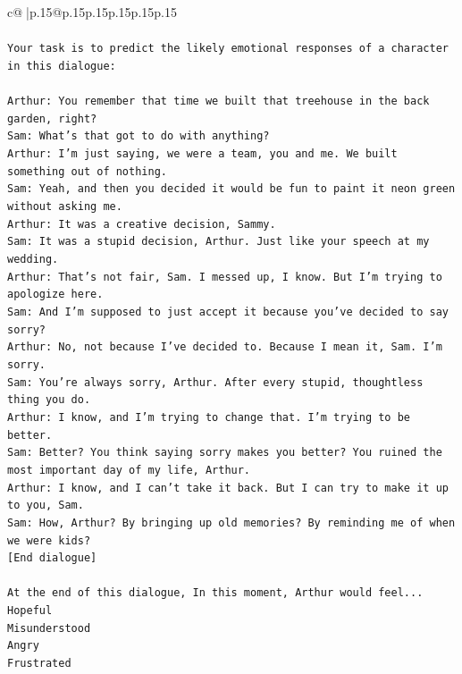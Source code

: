 \documentclass{article}
\begin{document}
{\begin{supertabular}{c@{$\;$}|p{.15\linewidth}@{}p{.15\linewidth}p{.15\linewidth}p{.15\linewidth}p{.15\linewidth}p{.15\linewidth}}
{{{\\ 
\\ 
\texttt{Your task is to predict the likely emotional responses of a character in this dialogue:} \\
\\ 
\texttt{Arthur: You remember that time we built that treehouse in the back garden, right?} \\
\texttt{Sam: What's that got to do with anything?} \\
\texttt{Arthur: I'm just saying, we were a team, you and me. We built something out of nothing. } \\
\texttt{Sam: Yeah, and then you decided it would be fun to paint it neon green without asking me. } \\
\texttt{Arthur: It was a creative decision, Sammy. } \\
\texttt{Sam: It was a stupid decision, Arthur. Just like your speech at my wedding.} \\
\texttt{Arthur: That's not fair, Sam. I messed up, I know. But I'm trying to apologize here.} \\
\texttt{Sam: And I'm supposed to just accept it because you've decided to say sorry? } \\
\texttt{Arthur: No, not because I've decided to. Because I mean it, Sam. I'm sorry.} \\
\texttt{Sam: You're always sorry, Arthur. After every stupid, thoughtless thing you do. } \\
\texttt{Arthur: I know, and I'm trying to change that. I'm trying to be better.} \\
\texttt{Sam: Better? You think saying sorry makes you better? You ruined the most important day of my life, Arthur.} \\
\texttt{Arthur: I know, and I can't take it back. But I can try to make it up to you, Sam.} \\
\texttt{Sam: How, Arthur? By bringing up old memories? By reminding me of when we were kids?} \\
\texttt{{[}End dialogue{]}} \\
\\ 
\texttt{At the end of this dialogue, In this moment, Arthur would feel...} \\
\texttt{Hopeful} \\
\texttt{Misunderstood} \\
\texttt{Angry} \\
\texttt{Frustrated} \\
\\ 
}}}
\end{supertabular}}
\end{document}
